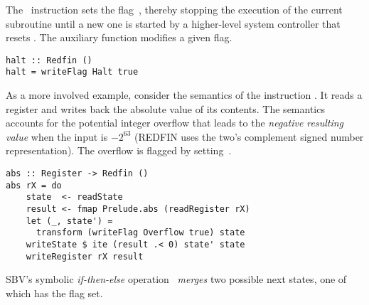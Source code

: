 The~ instruction sets the flag~, thereby stopping the
execution of the current subroutine until a new one is started by a higher-level
system controller that resets . The auxiliary function 
modifies a given flag.

\begin{verbatim}
halt :: Redfin ()
halt = writeFlag Halt true
\end{verbatim}


\noindent
As a more involved example, consider the semantics of the instruction .
It reads a register and writes back the absolute value of its contents.
The semantics accounts for the potential integer overflow that leads to the
\emph{negative resulting value} when the input is $-2^{63}$ (REDFIN
uses the two's complement signed number representation). The overflow is flagged
by setting~.

\begin{verbatim}
abs :: Register -> Redfin ()
abs rX = do
    state  <- readState
    result <- fmap Prelude.abs (readRegister rX)
    let (_, state') =
      transform (writeFlag Overflow true) state
    writeState $ ite (result .< 0) state' state
    writeRegister rX result
\end{verbatim}

\noindent
SBV's symbolic \emph{if-then-else} operation~ \emph{merges} two possible
next states, one of which has the  flag set.



